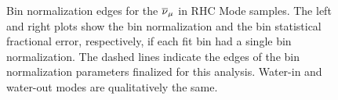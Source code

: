 \begin{figure}


\caption[Bin Normalization Edges for the $\numubar$ in RHC Mode Samples]{Bin normalization edges for the $\protect\overline{\nu}_{\mu}$ in RHC Mode samples.
The left and right plots show the bin normalization and the bin statistical
fractional error, respectively, if each fit bin had a single bin normalization.
The dashed lines indicate the edges of the bin normalization parameters
finalized for this analysis. Water-in and water-out modes are qualitatively
the same. \label{fig:Bin-normalization-edgesNumubarRHC}}
\end{figure}

